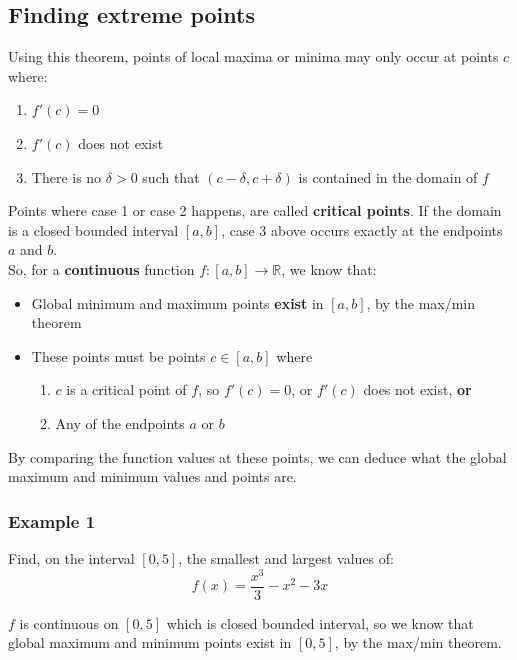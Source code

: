 \documentclass[11pt]{article}
\begin{document}
\subsection{Finding extreme points}
\label{sec:org2ecd90a}
Using this theorem, points of local maxima or minima may only occur at points \(c\) where:
\begin{enumerate}
\item \(f'(c) = 0\)
\item \(f'(c)\) does not exist
\item There is no \(\delta > 0\) such that \((c - \delta, c + \delta)\) is contained in the domain of \(f\)
\end{enumerate}

Points where case 1 or case 2 happens, are called \textbf{critical points}. If the domain is a closed bounded interval \([a, b]\), case 3 above occurs exactly at the endpoints \(a\) and \(b\).
\\[0pt]

So, for a \textbf{continuous} function \(f : [a, b] \rightarrow \mathbb{R}\), we know that:
\begin{itemize}
\item Global minimum and maximum points \textbf{exist} in \([a, b]\), by the max/min theorem
\item These points must be points \(c \in [a, b]\) where
\begin{enumerate}
\item \(c\) is a critical point of \(f\), so \(f'(c) = 0\), or \(f'(c)\) does not exist, \textbf{or}
\item Any of the endpoints \(a\) or \(b\)
\end{enumerate}
\end{itemize}

By comparing the function values at these points, we can deduce what the global maximum and minimum values and points are.

\newpage

\subsubsection{Example 1}
\label{sec:org887c113}
Find, on the interval \([0, 5]\), the smallest and largest values of:
\[f(x) = \frac{x^3}{3} - x^2 - 3x\]

\(f\) is continuous on \([0, 5]\) which is closed bounded interval, so we know that global maximum and minimum points exist in \([0, 5]\), by the max/min theorem.
\\[0pt]
\end{document}
